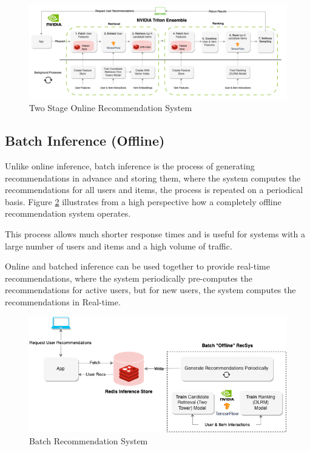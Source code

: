 \begin{figure}[H]
    \centering
    \includegraphics[width=1\textwidth]{assets/online-two-stage-recommender-pipeline.png}
    \caption[Two Stage Online Recommendation System]{Two Stage Online Recommendation System \cite{NvidiaOfflineToOnline}}
    \label{fig:TwoStageOnline}
\end{figure}



\subsection{Batch Inference (Offline)}
Unlike online inference, batch inference is the process of generating recommendations in advance and storing them, 
where the system computes the recommendations for all users and items, 
the process is repeated on a periodical basis.\cite{NvidiaOfflineToOnline} 
Figure \ref{fig:BatchRecSys} illustrates from a high perspective how a completely offline recommendation system operates.

This process allows much shorter response times and is useful for systems with a large number of users and items and a high volume of traffic.

Online and batched inference can be used together to provide real-time recommendations, where the system periodically pre-computes the recommendations for active users, but for new users, the system computes the recommendations in Real-time.



\begin{figure}[H]
    \centering
    \includegraphics[width=1\textwidth]{assets/batch-recommendation-system.png}
    \caption[Batch Recommendation System]{Batch Recommendation System \cite{NvidiaOfflineToOnline}}
    \label{fig:BatchRecSys}
\end{figure}